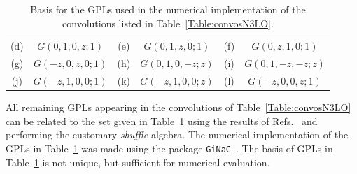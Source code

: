 \documentclass[12pt]{article}
\begin{document}
\begin{appendix}
\begin{table}
\begin{center}
\begin{tabular}{ |c|c||c|c||c|c| }
\multirow{1}{*}{(d)} 

& $G(0,1,0,z;1)$



& \multirow{1}{*}{(e)} 

& $G(0,1,z,0;1)$  

& \multirow{1}{*}{(f)} 

& $G(0,z,1,0;1)$\\

\multirow{1}{*}{(g)} 

& $G(-z,0,z,0;1)$ 

& \multirow{1}{*}{(h)} 

& $G(0,1,0,-z;z)$  

&\multirow{1}{*}{(i)} 

& $G(0,1,-z,-z;z)$\\

 \multirow{1}{*}{(j)} 

& $G(-z,1,0,0;1)$ 

& \multirow{1}{*}{(k)} 

& $G(-z,1,0,0;z)$  

& \multirow{1}{*}{(l)} 

& $G(-z,0,0,z;1)$

\\  

\hline
\end{tabular}
\caption{\label{Table:GPLsused}
{Basis for the GPLs used in the numerical implementation of the convolutions listed in Table~\ref{Table:convosN3LO}. 
}}
\renewcommand{\arraystretch}{1}
\end{center}
\end{table}
All remaining GPLs appearing in the convolutions of Table~\ref{Table:convosN3LO} can be related to the set given in Table~\ref{Table:GPLsused} using the results of Refs.~\cite{Frellesvig:2016ske,Maitre:2005uu,Duhr:2011zq} and performing the customary \textit{shuffle} algebra. The numerical implementation of the GPLs in Table~\ref{Table:GPLsused} was made using the package \texttt{GiNaC}~\cite{Bauer:2000cp,Vollinga:2004sn}. The basis of GPLs in Table~\ref{Table:GPLsused} is not unique, but 
sufficient for  numerical evaluation.


\end{appendix}
\end{document}
